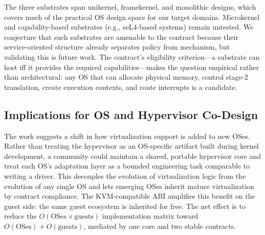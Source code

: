 The three substrates span unikernel, framekernel, and monolithic designs, which
covers much of the practical OS design space for our target domains. Microkernel
and capability-based substrates (e.g., seL4-based systems) remain untested. We
conjecture that such substrates are amenable to the contract because their
service-oriented structure already separates policy from mechanism, but
validating this is future work. The contract's eligibility criterion---a
substrate can host \axvisor{} iff it provides the required capabilities---makes
the question empirical rather than architectural: any OS that can allocate
physical memory, control stage-2 translation, create execution contexts, and
route interrupts is a candidate.

\subsection{Implications for OS and Hypervisor Co-Design}

The work suggests a shift in how virtualization support is added to new OSes.
Rather than treating the hypervisor as an OS-specific artifact built during
kernel development, a community could maintain a shared, portable hypervisor
core and treat each OS's adaptation layer as a bounded engineering task
comparable to writing a driver. This decouples the evolution of virtualization
logic from the evolution of any single OS and lets emerging OSes inherit mature
virtualization by contract compliance. The KVM-compatible ABI amplifies this
benefit on the guest side: the same guest ecosystem is inherited for free. The
net effect is to reduce the $O(\text{OSes} \times \text{guests})$ implementation
matrix toward $O(\text{OSes}) + O(\text{guests})$, mediated by one core and two
stable contracts.
